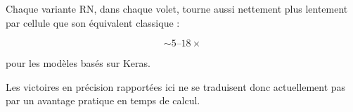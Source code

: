 \documentclass[11pt]{article}
\begin{document}
Chaque variante RN, dans chaque volet, tourne aussi nettement plus lentement
par cellule que son équivalent classique :

\[
\sim 5\text{--}18\times
\]

pour les modèles basés sur Keras.

Les victoires en précision rapportées ici ne se traduisent donc actuellement
pas par un avantage pratique en temps de calcul.


\end{document}
